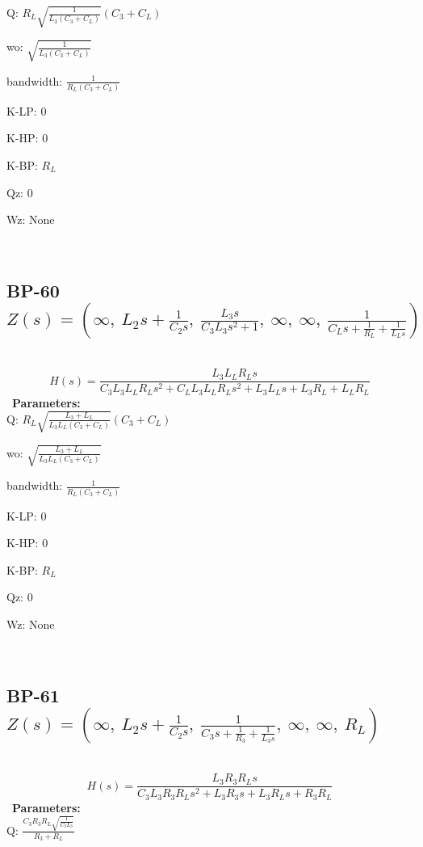 \documentclass{article}
\begin{document}
Q: $R_{L} \sqrt{\frac{1}{L_{3} \left(C_{3} + C_{L}\right)}} \left(C_{3} + C_{L}\right)$\ 

wo: $\sqrt{\frac{1}{L_{3} \left(C_{3} + C_{L}\right)}}$\ 

bandwidth: $\frac{1}{R_{L} \left(C_{3} + C_{L}\right)}$\ 

K-LP: $0$\ 

K-HP: $0$\ 

K-BP: $R_{L}$\ 

Qz: $0$\ 

Wz: $\text{None}$\ 

\ 

\subsection{BP-60 $Z(s) = \left( \infty, \  L_{2} s + \frac{1}{C_{2} s}, \  \frac{L_{3} s}{C_{3} L_{3} s^{2} + 1}, \  \infty, \  \infty, \  \frac{1}{C_{L} s + \frac{1}{R_{L}} + \frac{1}{L_{L} s}}\right)$ } \ 
\textbf{\[H(s) = \frac{L_{3} L_{L} R_{L} s}{C_{3} L_{3} L_{L} R_{L} s^{2} + C_{L} L_{3} L_{L} R_{L} s^{2} + L_{3} L_{L} s + L_{3} R_{L} + L_{L} R_{L}}\] } \ 
\textbf{Parameters:}\\ 

Q: $R_{L} \sqrt{\frac{L_{3} + L_{L}}{L_{3} L_{L} \left(C_{3} + C_{L}\right)}} \left(C_{3} + C_{L}\right)$\ 

wo: $\sqrt{\frac{L_{3} + L_{L}}{L_{3} L_{L} \left(C_{3} + C_{L}\right)}}$\ 

bandwidth: $\frac{1}{R_{L} \left(C_{3} + C_{L}\right)}$\ 

K-LP: $0$\ 

K-HP: $0$\ 

K-BP: $R_{L}$\ 

Qz: $0$\ 

Wz: $\text{None}$\ 

\ 

\subsection{BP-61 $Z(s) = \left( \infty, \  L_{2} s + \frac{1}{C_{2} s}, \  \frac{1}{C_{3} s + \frac{1}{R_{3}} + \frac{1}{L_{3} s}}, \  \infty, \  \infty, \  R_{L}\right)$ } \ 
\textbf{\[H(s) = \frac{L_{3} R_{3} R_{L} s}{C_{3} L_{3} R_{3} R_{L} s^{2} + L_{3} R_{3} s + L_{3} R_{L} s + R_{3} R_{L}}\] } \ 
\textbf{Parameters:}\\ 

Q: $\frac{C_{3} R_{3} R_{L} \sqrt{\frac{1}{C_{3} L_{3}}}}{R_{3} + R_{L}}$\ 
\end{document}
